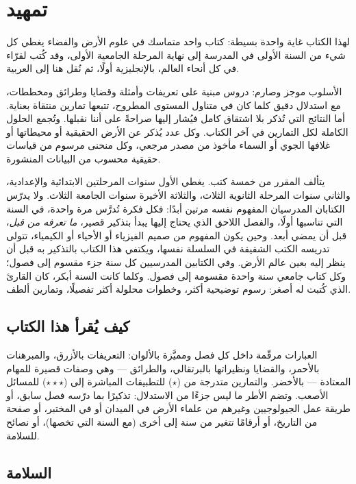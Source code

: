\chapter{تمهيد}

لهذا الكتاب غاية واحدة بسيطة: كتاب واحد متماسك في علوم الأرض والفضاء
يغطي كل شيء من السنة الأولى في المدرسة إلى نهاية المرحلة الجامعية الأولى،
وقد كُتب لقرّاء في كل أنحاء العالم، بالإنجليزية أولًا، ثم نُقل هنا إلى
العربية.

الأسلوب موجز وصارم: دروس مبنية على تعريفات وأمثلة وقضايا وطرائق
ومخططات، مع استدلال دقيق كلما كان في متناول المستوى المطروح، تتبعها تمارين
منتقاة بعناية. أما النتائج التي تُذكر بلا اشتقاق كامل فيُشار إليها صراحةً على
أننا نقبلها. وتُجمع الحلول الكاملة لكل التمارين في آخر الكتاب.
وكل عدد يُذكر عن الأرض الحقيقية أو محيطاتها أو غلافها الجوي أو السماء
مأخوذ من مصدر مرجعي، وكل منحنى مرسوم من قياسات حقيقية محسوب من
البيانات المنشورة.

يتألف المقرر من خمسة كتب. يغطي الأول سنوات المرحلتين الابتدائية
والإعدادية، والثاني سنوات المرحلة الثانوية الثلاث، والثلاثة الأخيرة سنوات
الجامعة الثلاث. ولا يدرّس الكتابان المدرسيان المفهوم نفسه مرتين أبدًا: فكل
فكرة تُدرَّس مرة واحدة، في السنة التي تناسبها أولًا، والفصل اللاحق الذي
يحتاج إليها يبدأ بتذكير قصير، \emph{ما تعرفه من قبل}، قبل أن يمضي أبعد.
وحين يكون المفهوم من صميم الفيزياء أو الأحياء أو الكيمياء، تتولى تدريسه
الكتب الشقيقة في السلسلة نفسها، ويكتفي هذا الكتاب بالتذكير به قبل أن
ينظر إليه بعين عالم الأرض. وفي الكتابين المدرسيين كل سنة جزء مقسوم إلى
فصول؛ وكل كتاب جامعي سنة واحدة مقسومة إلى فصول. وكلما كانت السنة أبكر،
كان القارئ الذي كُتبت له أصغر: رسوم توضيحية أكثر، وخطوات محلولة أكثر
تفصيلًا، وتمارين ألطف.

\section*{كيف يُقرأ هذا الكتاب}

العبارات مرقّمة داخل كل فصل ومميَّزة بالألوان: التعريفات بالأزرق،
والمبرهنات بالأحمر، والقضايا ونظيراتها بالبرتقالي، والطرائق --- وهي وصفات
قصيرة للمهام المعتادة --- بالأخضر. والتمارين متدرجة من ($\star$)
للتطبيقات المباشرة إلى ($\star\star\star$) للمسائل الأصعب. وتضم الأطر
ما ليس جزءًا من الاستدلال: تذكيرًا بما درّسه فصل سابق، أو طريقة عمل
الجيولوجيين وغيرهم من علماء الأرض في الميدان أو في المختبر، أو صفحة من
التاريخ، أو أرقامًا تتغير من سنة إلى أخرى (مع السنة التي تخصها)، أو
نصائح للسلامة.

\section*{السلامة}

